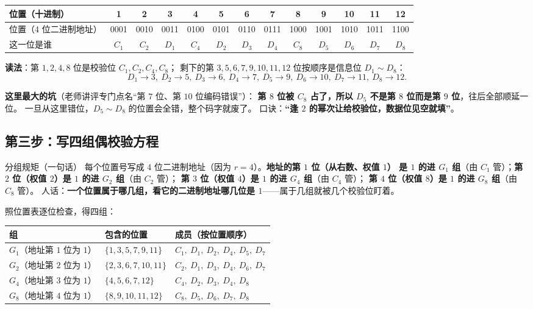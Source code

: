\documentclass[11pt,a4paper]{ctexart}
\begin{document}
\begin{center}\small
\setlength{\tabcolsep}{4pt}
\begin{tabular}{@{}l*{12}{c}@{}}
\toprule
位置（十进制） & 1&2&3&4&5&6&7&8&9&10&11&12\\
\midrule
位置（4 位二进制地址） & 0001&0010&0011&0100&0101&0110&0111&1000&1001&1010&1011&1100\\
\midrule
这一位是谁 & $C_1$&$C_2$&$D_1$&$C_4$&$D_2$&$D_3$&$D_4$&$C_8$&$D_5$&$D_6$&$D_7$&$D_8$\\
\bottomrule
\end{tabular}
\end{center}

\textbf{读法}：第 $1,2,4,8$ 位是校验位 $C_1,C_2,C_4,C_8$；
剩下的第 $3,5,6,7,9,10,11,12$ 位按顺序是信息位 $D_1\sim D_8$：
\[
D_1\to3,\ D_2\to5,\ D_3\to6,\ D_4\to7,\ D_5\to9,\ D_6\to10,\ D_7\to11,\ D_8\to12 .
\]

\textbf{这里最大的坑}（老师讲评专门点名“第 $7$ 位、第 $10$ 位编码错误”）：
\textbf{第 $8$ 位被 $C_8$ 占了，所以 $D_5$ 不是第 $8$ 位而是第 $9$ 位}，往后全部顺延一位。
一旦从这里错位，$D_5\sim D_8$ 的位置会全错，整个码字就废了。
口诀：\textbf{“逢 $2$ 的幂次让给校验位，数据位见空就填”}。

\subsection{第三步：写四组偶校验方程}

\begin{defbox}{分组规矩（一句话）}
每个位置号写成 $4$ 位二进制地址（因为 $r=4$）。\textbf{地址的第 $1$ 位（从右数、权值 $1$）
是 $1$ 的进 $G_1$ 组}（由 $C_1$ 管）；\textbf{第 $2$ 位（权值 $2$）是 $1$ 的进 $G_2$ 组}（由 $C_2$ 管）；
\textbf{第 $3$ 位（权值 $4$）是 $1$ 的进 $G_4$ 组}（由 $C_4$ 管）；
\textbf{第 $4$ 位（权值 $8$）是 $1$ 的进 $G_8$ 组}（由 $C_8$ 管）。
人话：\textbf{一个位置属于哪几组，看它的二进制地址哪几位是 $1$}——属于几组就被几个校验位盯着。
\end{defbox}

照位置表逐位检查，得四组：

\begin{center}\small
\setlength{\tabcolsep}{5pt}
\begin{tabular}{@{}lll@{}}
\toprule
组 & 包含的位置 & 成员（按位置顺序）\\
\midrule
$G_1$（地址第 $1$ 位为 $1$） & $\{1,3,5,7,9,11\}$ & $C_1,\ D_1,\ D_2,\ D_4,\ D_5,\ D_7$\\
$G_2$（地址第 $2$ 位为 $1$） & $\{2,3,6,7,10,11\}$ & $C_2,\ D_1,\ D_3,\ D_4,\ D_6,\ D_7$\\
$G_4$（地址第 $3$ 位为 $1$） & $\{4,5,6,7,12\}$ & $C_4,\ D_2,\ D_3,\ D_4,\ D_8$\\
$G_8$（地址第 $4$ 位为 $1$） & $\{8,9,10,11,12\}$ & $C_8,\ D_5,\ D_6,\ D_7,\ D_8$\\
\bottomrule
\end{tabular}
\end{center}
\end{document}
